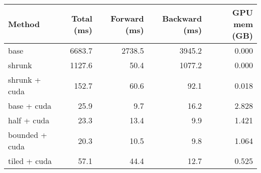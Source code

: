 \begin{tabular}{lrrrr}
\hline
 Method         &   Total (ms) &   Forward (ms) &   Backward (ms) &   GPU mem (GB) \\
\hline
 base           &       6683.7 &         2738.5 &          3945.2 &          0.000 \\
 shrunk         &       1127.6 &           50.4 &          1077.2 &          0.000 \\
 shrunk + cuda  &        152.7 &           60.6 &            92.1 &          0.018 \\
 base + cuda    &         25.9 &            9.7 &            16.2 &          2.828 \\
 half + cuda    &         23.3 &           13.4 &             9.9 &          1.421 \\
 bounded + cuda &         20.3 &           10.5 &             9.8 &          1.064 \\
 tiled + cuda   &         57.1 &           44.4 &            12.7 &          0.525 \\
\hline
\end{tabular}
